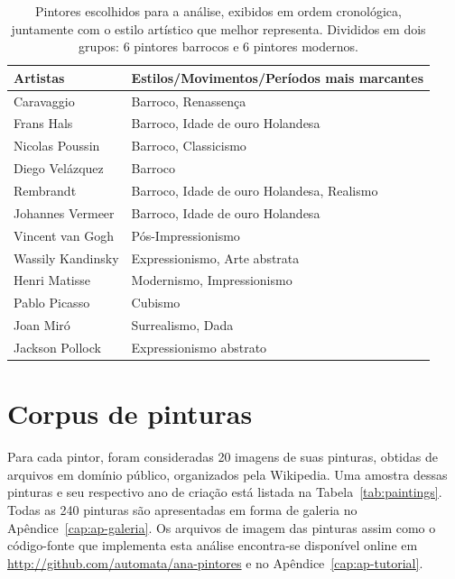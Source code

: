 \begin{table}
\begin{center}
\caption{\label{tab:painters} Pintores escolhidos para a análise, exibidos em
  ordem cronológica, juntamente com o estilo artístico que melhor
  representa. Divididos em dois grupos: 6 pintores barrocos e 6 pintores modernos.}

\begin{tabular}{l|l}
\hline

 Artistas                      & Estilos/Movimentos/Períodos mais marcantes \\ 
 
 \hline

 Caravaggio                    & Barroco, Renassença \\
 Frans Hals                    & Barroco, Idade de ouro Holandesa \\
 Nicolas Poussin               & Barroco, Classicismo \\
 Diego Vel\'{a}zquez           & Barroco \\
 Rembrandt                     & Barroco, Idade de ouro Holandesa, Realismo \\
 Johannes Vermeer              & Barroco, Idade de ouro Holandesa \\
 
 \hline
 
 Vincent van Gogh              & Pós-Impressionismo \\
 Wassily Kandinsky             & Expressionismo, Arte abstrata \\
 Henri Matisse                 & Modernismo, Impressionismo \\
 Pablo Picasso                 & Cubismo \\
 Joan Mir\'{o}                 & Surrealismo, Dada \\
 Jackson Pollock               & Expressionismo abstrato \\

\hline
\end{tabular}
\end{center}
\end{table}


\section{Corpus de pinturas}

Para cada pintor, foram consideradas 20 imagens de suas pinturas,
obtidas de arquivos em domínio público, organizados pela
Wikipedia. Uma amostra dessas pinturas e seu respectivo ano de criação
está listada na Tabela~\ref{tab:paintings}. Todas as 240 pinturas são
apresentadas em forma de galeria no Apêndice~\ref{cap:ap-galeria}. Os
arquivos de imagem das pinturas assim como o código-fonte que
implementa esta análise encontra-se disponível online em
\url{http://github.com/automata/ana-pintores} e no
Apêndice~\ref{cap:ap-tutorial}.

